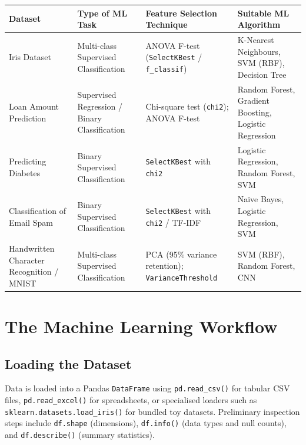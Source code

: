 \documentclass[12pt,a4paper]{article}
\begin{document}
\begin{center}
\renewcommand{\arraystretch}{1.35}
\begin{tabular}{|p{3.4cm}|p{2.8cm}|p{2.8cm}|p{3.2cm}|}
\hline
\textbf{Dataset} & \textbf{Type of ML Task} & \textbf{Feature Selection Technique}
  & \textbf{Suitable ML Algorithm} \\
\hline
Iris Dataset
  & Multi-class Supervised Classification
  & ANOVA F-test (\texttt{SelectKBest} / \texttt{f\_classif})
  & K-Nearest Neighbours, SVM (RBF), Decision Tree \\
\hline
Loan Amount Prediction
  & Supervised Regression / Binary Classification
  & Chi-square test (\texttt{chi2}); ANOVA F-test
  & Random Forest, Gradient Boosting, Logistic Regression \\
\hline
Predicting Diabetes
  & Binary Supervised Classification
  & \texttt{SelectKBest} with \texttt{chi2}
  & Logistic Regression, Random Forest, SVM \\
\hline
Classification of Email Spam
  & Binary Supervised Classification
  & \texttt{SelectKBest} with \texttt{chi2} / TF-IDF
  & Naïve Bayes, Logistic Regression, SVM \\
\hline
Handwritten Character Recognition / MNIST
  & Multi-class Supervised Classification
  & PCA (95\% variance retention); \texttt{VarianceThreshold}
  & SVM (RBF), Random Forest, CNN \\
\hline
\end{tabular}
\end{center}

\section{The Machine Learning Workflow}

\subsection{Loading the Dataset}

Data is loaded into a Pandas \texttt{DataFrame} using \texttt{pd.read\_csv()} for tabular CSV
files, \texttt{pd.read\_excel()} for spreadsheets, or specialised loaders such as
\texttt{sklearn.datasets.load\_iris()} for bundled toy datasets.
Preliminary inspection steps include \texttt{df.shape} (dimensions),
\texttt{df.info()} (data types and null counts), and \texttt{df.describe()} (summary statistics).
\end{document}
